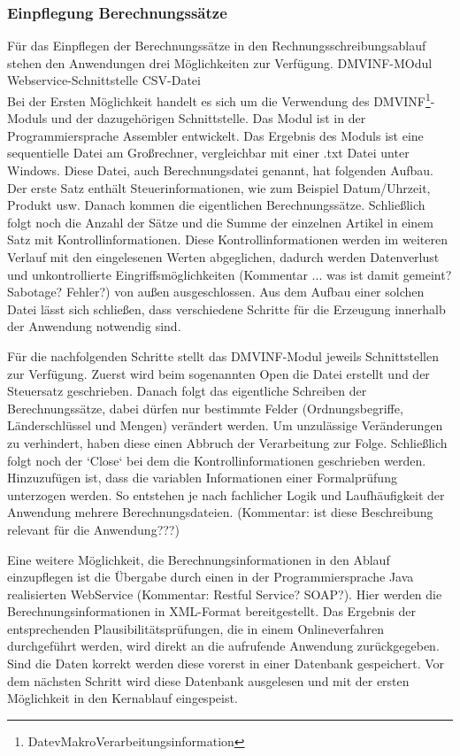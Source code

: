 \subsubsection{Einpflegung Berechnungssätze}
Für das Einpflegen der Berechnungssätze in den Rechnungsschreibungsablauf stehen den Anwendungen drei Möglichkeiten zur Verfügung.
DMVINF-MOdul
Webservice-Schnittstelle
CSV-Datei
\\
Bei der Ersten Möglichkeit handelt es sich um die Verwendung des DMVINF\footnote{DatevMakroVerarbeitungsinformation}-Moduls und der dazugehörigen Schnittstelle.
Das Modul ist in der Programmiersprache Assembler entwickelt.
Das Ergebnis des Moduls ist eine sequentielle Datei am Großrechner, vergleichbar mit einer .txt Datei unter Windows.
Diese Datei, auch Berechnungsdatei genannt, hat folgenden Aufbau.
Der erste Satz enthält Steuerinformationen, wie zum Beispiel Datum/Uhrzeit, Produkt usw.
Danach kommen die eigentlichen Berechnungssätze.
Schließlich folgt noch die Anzahl der Sätze und die Summe der einzelnen Artikel in einem Satz mit Kontrollinformationen.
Diese Kontrollinformationen werden im weiteren Verlauf mit den eingelesenen Werten abgeglichen, dadurch werden Datenverlust und unkontrollierte Eingriffsmöglichkeiten (Kommentar ... was ist damit gemeint? Sabotage? Fehler?)  von außen ausgeschlossen.
Aus dem Aufbau einer solchen Datei lässt sich schließen, dass verschiedene Schritte für die Erzeugung innerhalb der Anwendung notwendig sind.

Für die nachfolgenden Schritte stellt das DMVINF-Modul jeweils Schnittstellen zur Verfügung.
Zuerst wird beim sogenannten Open die Datei erstellt und der Steuersatz geschrieben.
Danach folgt das eigentliche Schreiben der Berechnungssätze, dabei dürfen nur bestimmte Felder (Ordnungsbegriffe, Länderschlüssel und Mengen) verändert werden.
Um unzulässige Veränderungen zu verhindert, haben diese einen Abbruch der Verarbeitung zur Folge.
Schließlich folgt noch der `Close` bei dem die Kontrollinformationen geschrieben werden.
Hinzuzufügen ist, dass die variablen Informationen einer Formalprüfung unterzogen werden.
So entstehen je nach fachlicher Logik und Laufhäufigkeit der Anwendung mehrere Berechnungsdateien. (Kommentar: ist diese Beschreibung relevant für die Anwendung???)

Eine weitere Möglichkeit, die Berechnungsinformationen in den Ablauf einzupflegen ist die Übergabe durch einen in der Programmiersprache Java realisierten WebService (Kommentar: Restful Service? SOAP?).
Hier werden die Berechnungsinformationen in XML-Format bereitgestellt.
Das Ergebnis der entsprechenden Plausibilitätsprüfungen, die in einem Onlineverfahren durchgeführt werden, wird direkt an die aufrufende Anwendung zurückgegeben.
Sind die Daten korrekt werden diese vorerst in einer Datenbank gespeichert.
Vor dem nächsten Schritt wird diese Datenbank ausgelesen und mit der ersten Möglichkeit in den Kernablauf eingespeist.

